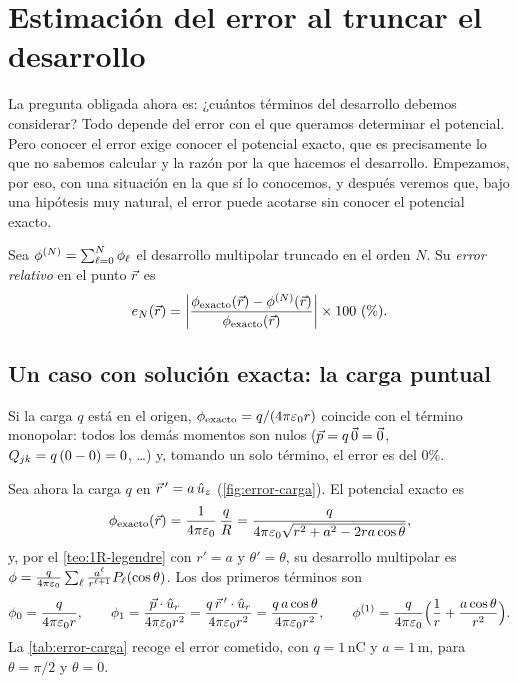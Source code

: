 \section{Estimación del error al truncar el desarrollo}\label{sec:error}
La pregunta obligada ahora es: ¿cuántos términos del desarrollo debemos considerar? Todo depende del error con el que queramos determinar el
potencial. Pero conocer el error exige conocer el potencial exacto, que es precisamente lo que no sabemos calcular y la razón por la que hacemos el
desarrollo. Empezamos, por eso, con una situación en la que sí lo conocemos, y después veremos que, bajo una hipótesis muy natural, el error puede
acotarse sin conocer el potencial exacto.

\begin{definicion}\label{def:error}
Sea $\phi^{(N)}=\sum_{\ell=0}^{N}\phi_{\ell}$ el desarrollo multipolar truncado en el orden $N$. Su \emph{error relativo} en el punto $\vec{r}$ es
\begin{equation}\label{eq:error}
  e_{N}(\vec{r})=\left\lvert\frac{\phi_{\mathrm{exacto}}(\vec{r})-\phi^{(N)}(\vec{r})}{\phi_{\mathrm{exacto}}(\vec{r})}\right\rvert\times100\ (\%).
\end{equation}
\end{definicion}

\subsection{Un caso con solución exacta: la carga puntual}\label{sec:error-carga}
\begin{ejemplo}\label{ej:carga-origen}
Si la carga $q$ está en el origen, $\phi_{\mathrm{exacto}}=q/(4\pi\varepsilon_{0} r)$ coincide con el término monopolar: todos los demás momentos son nulos ($\vec{p}=q\,\vec{0}=\vec{0}$,
$Q_{jk}=q\,(0-0)=0$, \dots) y, tomando un solo término, el error es del $0\%$.
\end{ejemplo}

\begin{ejemplo}\label{ej:carga-fuera}
Sea ahora la carga $q$ en $\vec{r}\,'=a\,\hat{u}_{z}$ (\cref{fig:error-carga}). El potencial exacto es
\[
  \phi_{\mathrm{exacto}}(\vec{r})=\frac{1}{4\pi\varepsilon_{0}}\,\frac{q}{R}=\frac{q}{4\pi\varepsilon_{0}\sqrt{r^{2}+a^{2}-2ra\cos\theta}},
\]
y, por el \cref{teo:1R-legendre} con $r'=a$ y $\theta'=\theta$, su desarrollo multipolar es $\phi=\frac{q}{4\pi\varepsilon_{0}}\sum_{\ell}\frac{a^{\ell}}{r^{\ell+1}}P_{\ell}(\cos\theta)$. Los
dos primeros términos son
\[
  \phi_{0}=\frac{q}{4\pi\varepsilon_{0} r},\qquad \phi_{1}=\frac{\vec{p}\cdot\hat{u}_{r}}{4\pi\varepsilon_{0} r^{2}}=\frac{q\,\vec{r}\,'\cdot\hat{u}_{r}}{4\pi\varepsilon_{0} r^{2}}=\frac{q\,a\cos\theta}{4\pi\varepsilon_{0} r^{2}},
  \qquad \phi^{(1)}=\frac{q}{4\pi\varepsilon_{0}}\Bigl(\frac1r+\frac{a\cos\theta}{r^{2}}\Bigr).
\]
La \cref{tab:error-carga} recoge el error cometido, con $q=1\,\mathrm{nC}$ y $a=1\,\mathrm{m}$, para $\theta=\pi/2$ y $\theta=0$.
\end{ejemplo}

